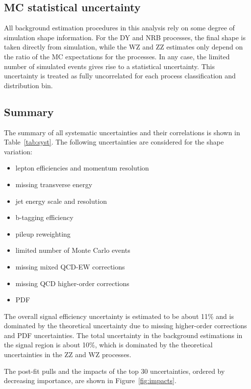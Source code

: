 \subsection{MC statistical uncertainty}

All background estimation procedures in this analysis rely on some degree
of simulation shape information.
For the DY and NRB processes, the final shape is taken directly from simulation, 
while the WZ and ZZ estimates only depend on the ratio of the MC expectations for the processes.
In any case, the limited number of simulated events gives rise to a statistical uncertainty.
This uncertainty is treated as fully uncorrelated for each process classification and distribution bin.
\subsection{Summary}
\label{sec:syst_summary}

The summary of all systematic uncertainties and their correlations is shown in Table~\ref{tab:syst}.
The following uncertainties are considered for the shape variation:
\begin{itemize}
\item lepton efficiencies and momentum resolution 
\item missing transverse energy 
\item jet energy scale and resolution 
\item b-tagging efficiency 
\item pileup reweighting 
\item limited number of Monte Carlo events
\item missing mixed QCD-EW corrections
\item missing QCD higher-order corrections
\item PDF
\end{itemize}

The overall signal efficiency uncertainty is estimated to be about 11\%
and is dominated by the theoretical uncertainty due to missing
higher-order corrections and PDF uncertainties. The total uncertainty in the 
background estimations in the signal region is about 10\%, which is 
dominated by the theoretical uncertainties in the ZZ and WZ processes.

The post-fit pulls and the impacts of the top 30 uncertainties, ordered by decreasing importance,
are shown in Figure~\ref{fig:impacts}.

